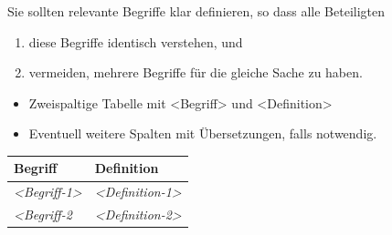 \documentclass[]{article}
\begin{document}
Sie sollten relevante Begriffe klar definieren, so dass alle Beteiligten

\begin{enumerate}
\def\labelenumi{\arabic{enumi}.}
\item
  diese Begriffe identisch verstehen, und
\item
  vermeiden, mehrere Begriffe für die gleiche Sache zu haben.
\end{enumerate}

\begin{itemize}
\item
  Zweispaltige Tabelle mit \textless{}Begriff\textgreater{} und
  \textless{}Definition\textgreater{}
\item
  Eventuell weitere Spalten mit Übersetzungen, falls notwendig.
\end{itemize}

\begin{longtable}[]{@{}ll@{}}
\toprule
\begin{minipage}[b]{0.31\columnwidth}\raggedright
Begriff\strut
\end{minipage} & \begin{minipage}[b]{0.63\columnwidth}\raggedright
Definition\strut
\end{minipage}\tabularnewline
\midrule
\endhead
\begin{minipage}[t]{0.31\columnwidth}\raggedright
\emph{\textless{}Begriff-1\textgreater{}}\strut
\end{minipage} & \begin{minipage}[t]{0.63\columnwidth}\raggedright
\emph{\textless{}Definition-1\textgreater{}}\strut
\end{minipage}\tabularnewline
\begin{minipage}[t]{0.31\columnwidth}\raggedright
\emph{\textless{}Begriff-2}\strut
\end{minipage} & \begin{minipage}[t]{0.63\columnwidth}\raggedright
\emph{\textless{}Definition-2\textgreater{}}\strut
\end{minipage}\tabularnewline
\bottomrule
\end{longtable}
\end{document}
